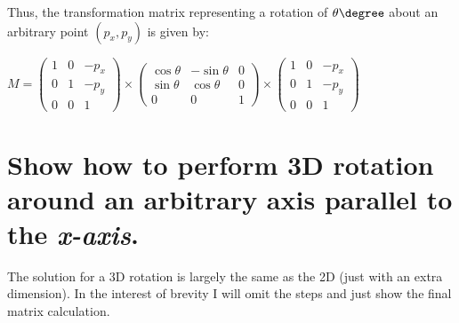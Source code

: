 \documentclass{supervision}
\begin{document}
\begin{questions}
\begin{parts}
\begin{solution}
        Thus, the transformation matrix representing a rotation of $\theta\degree$ about an arbitrary point $(p_x, p_y)$ is given by:
        
        \begin{center}
        
            $
            M =
            \begin{pmatrix}
            1 & 0 & -p_x \\ 
            0 & 1 & -p_y \\ 
            0 & 0 & 1
            \end{pmatrix}
            \times
            \begin{pmatrix}
            \cos{\theta} & -\sin{\theta} & 0 \\ 
            \sin{\theta} &  \cos{\theta} & 0 \\ 
            0            & 0             & 1
            \end{pmatrix}
            \times
            \begin{pmatrix}
            1 & 0 & -p_x \\ 
            0 & 1 & -p_y \\ 
            0 & 0 & 1
            \end{pmatrix}
            $
        \end{center}

 
        \end{solution}

        \part{Show how to perform 3D rotation around an arbitrary axis parallel to the \textit{x-axis}.}
        \begin{solution}
        The solution for a 3D rotation is largely the same as the 2D (just with an extra dimension). In the interest of brevity I will omit the steps and just show the final matrix calculation.
        

\end{solution}
\end{parts}
\end{questions}
\end{document}
